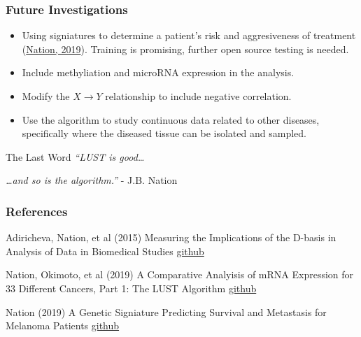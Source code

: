 \documentclass[
	11pt, %
]{beamer}
\begin{document}
\begin{frame}
    \frametitle{Future Investigations}
    \begin{itemize}
        \item Using signiatures to determine a patient's risk and aggresiveness of treatment (\href{https://github.com/tristanh314/lust-cancer-2019/blob/master/papers/melanoma_signature_2.pdf}{Nation, 2019}). Training is promising, further open source testing is needed.
        \pause
        \item Include methyliation and microRNA expression in the analysis.
        \pause
        \item Modify the $X \rightarrow Y$ relationship to include negative correlation.
        \pause
        \item Use the algorithm to study continuous data related to other diseases, specifically where the diseased tissue can be isolated and sampled.
    \end{itemize}
    \begin{block}{The Last Word}
        \emph{``LUST is good\ldots}
        \pause
        \smallskip

        \emph{\ldots and so is the algorithm.''} - J.B. Nation
    \end{block}
\end{frame}


\begin{frame} \frametitle{References}
	
	\begin{thebibliography}{99}
		\footnotesize
		
			Adiricheva, Nation, et al (2015)
			\newblock Measuring the Implications of the D-basis in Analysis of Data in Biomedical Studies
			\newblock \href{https://github.com/tristanh314/lust-cancer-2019/blob/master/papers/Dbasinapp.pdf}{github}
			
			Nation, Okimoto, et al (2019)
			\newblock A Comparative Analyisis of mRNA Expression for 33 Different Cancers, Part 1: The LUST Algorithm
			\newblock \href{https://github.com/tristanh314/lust-cancer-2019/blob/master/papers/lust_2019_part_1.pdf}{github}
        
			Nation (2019)
			\newblock A Genetic Signiature Predicting Survival and Metastasis for Melanoma Patients
			\newblock \href{https://github.com/tristanh314/lust-cancer-2019/blob/master/papers/melanoma_signature_2.pdf}{github}
    
        \end{thebibliography}

\end{frame}
\end{document}
